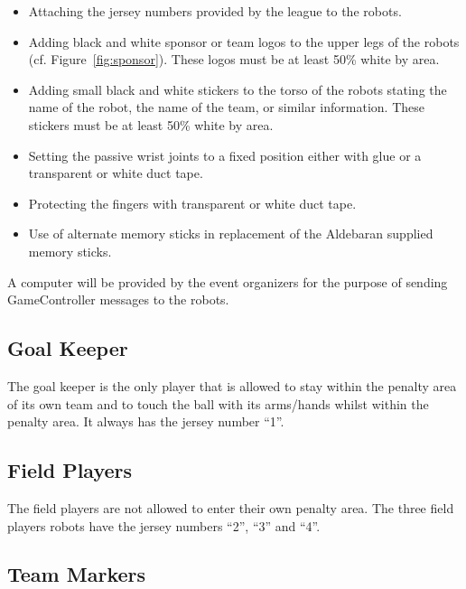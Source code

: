 \documentclass[12pt]{article}
\newcommand{\cf}{\mbox{cf.}\xspace}
\begin{document}
\begin{itemize}

\item Attaching the jersey numbers provided by the league to the robots.

\item Adding black and white sponsor or team logos to the upper legs of the robots (\cf Figure~\ref{fig:sponsor}). These logos must be at least 50\% white by area.

\item Adding small black and white stickers to the torso of the robots stating the name of the robot, the name of the team, or similar information. These stickers must be at least 50\% white by area.

\item Setting the passive wrist joints to a fixed position either with glue or a transparent or white duct tape.

\item Protecting the fingers with transparent or white duct tape.

\item Use of alternate memory sticks in replacement of the Aldebaran supplied memory sticks.

\end{itemize}

A computer will be provided by the event organizers for the purpose of sending GameController messages to the robots.

\subsection{Goal Keeper}
\label{sec:goal_keeper}

The goal keeper is the only player that is allowed to stay within the penalty area of its own team and to touch the ball with its arms/hands whilst within the penalty area. It always has the jersey number ``1''.

\subsection{Field Players}
\label{sec:field_players}

The field players are not allowed to enter their own penalty area. The three field players robots have the jersey numbers ``2'', ``3'' and ``4''.

\subsection{Team Markers}
\label{sec:team_markers}
\end{document}
